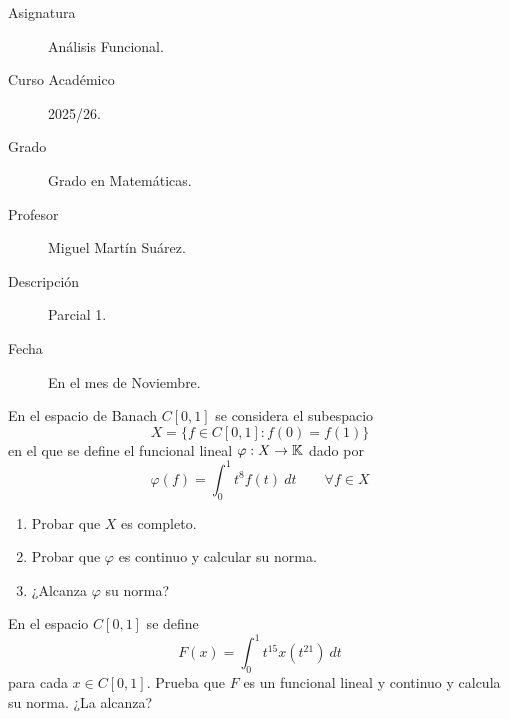 \documentclass[12pt]{article}
\begin{document}

    
    

    \begin{description}
        \item[Asignatura] Análisis Funcional.
        \item[Curso Académico] 2025/26.
        \item[Grado] Grado en Matemáticas.
        \item[Profesor] Miguel Martín Suárez.
        \item[Descripción] Parcial 1.
        \item[Fecha] En el mes de Noviembre.
    
    \end{description}
    \newpage


    
    \begin{ejercicio}
        En el espacio de Banach $C[0,1]$ se considera el subespacio
        \begin{equation*}
            X = \{f\in C[0,1] : f(0) = f(1)\}
        \end{equation*}
        en el que se define el funcional lineal $\varphi:X\to \mathbb{K}$ dado por
        \begin{equation*}
            \varphi(f) = \int_{0}^{1} t^8 f(t)~dt  \qquad \forall f\in X
        \end{equation*}
        \begin{enumerate}[label=(\alph*)]
            \item Probar que $X$ es completo.
            \item Probar que $\varphi$ es continuo y calcular su norma.
            \item ¿Alcanza $\varphi$ su norma?
        \end{enumerate}
    \end{ejercicio}

    \begin{ejercicio}
        En el espacio $C[0,1]$ se define
        \begin{equation*}
            F(x) = \int_{0}^{1} t^{15}x(t^{21})~dt 
        \end{equation*}
        para cada $x\in C[0,1]$. Prueba que $F$ es un funcional lineal y continuo y calcula su norma. ¿La alcanza?
    \end{ejercicio}
\end{document}
